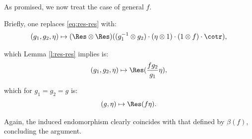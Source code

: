 \subsubsection{}\label{sss:gen'l-f}

As promised, we now treat the case of general $f$.

Briefly, one replaces \eqref{eq:res-res} with:
%
\[
(g_1,g_2,\eta) \mapsto
(\Res \otimes \Res)((g_1^{-1} \otimes g_2) \cdot
(\eta \otimes 1) \cdot (1 \otimes f) \cdot \cotr),
\]

 which Lemma \ref{l:res-res} implies is:
%
\[
(g_1,g_2,\eta) \mapsto \Res(\frac{f g_2}{g_1}\eta),
\]

 which for $g_1 = g_2 = g$ is:
%
\[
(g,\eta) \mapsto \Res(f \eta).
\]

 Again, the induced endomorphism clearly coincides with that
defined by $\beta(f)$, concluding the argument.
